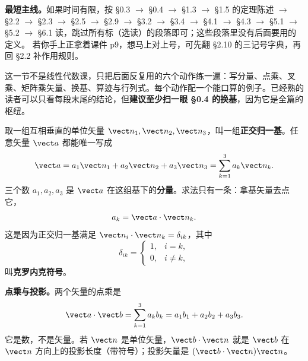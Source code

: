 \documentclass[11pt]{ctexart}
\let\orighdr\hdr
\renewcommand{\hdr}[2]{\par\needspace{10\baselineskip}\orighdr{#1}{#2}}
\let\origsubhdr\subhdr
\renewcommand{\subhdr}[1]{\par\needspace{3\baselineskip}\origsubhdr{#1}}
\begin{document}

\textbf{最短主线。}如果时间有限，按 §0.3 $\to$ §0.4 $\to$ §1.3 $\to$ §1.5 的定理陈述 $\to$ §2.2 $\to$ §2.3 $\to$ §2.5 $\to$ §2.9 $\to$ §3.2 $\to$ §3.4 $\to$ §4.1 $\to$ §4.3 $\to$ §5.1 $\to$ §5.2 $\to$ §6.1 读，跳过所有标（选读）的段落即可；这些段落里没有后面要用的定义。
若你手上正拿着课件 p9，想马上对上号，可先翻 §2.10 的三记号字典，再回 §2.2 补作用规则。


这一节不是线性代数课，只把后面反复用的六个动作练一遍：写分量、点乘、叉乘、矩阵乘矢量、换基、算迹与行列式。每个动作配一个能口算的例子。已经熟的读者可以只看每段末尾的结论，但\textbf{建议至少扫一眼 §0.4 的换基}，因为它是全篇的枢纽。



取一组互相垂直的单位矢量 $\vect n_1,\vect n_2,\vect n_3$，叫一组\textbf{正交归一基}。任意矢量 $\vect a$ 都能唯一写成
\[
\vect a=a_1\vect n_1+a_2\vect n_2+a_3\vect n_3=\sum_{k=1}^{3}a_k\vect n_k .
\]
三个数 $a_1,a_2,a_3$ 是 $\vect a$ 在这组基下的\textbf{分量}。求法只有一条：拿基矢量去点它，
\[
a_k=\vect a\cdot\vect n_k .
\]
这是因为正交归一基满足 $\vect n_i\cdot\vect n_k=\delta_{ik}$，其中
\[
\delta_{ik}=\begin{cases}1,&i=k,\\0,&i\ne k,\end{cases}
\]
叫\textbf{克罗内克符号}。

\textbf{点乘与投影。}两个矢量的点乘是
\[
\vect a\cdot\vect b=\sum_{k=1}^{3}a_kb_k=a_1b_1+a_2b_2+a_3b_3 .
\]
它是数，不是矢量。若 $\vect n$ 是单位矢量，$\vect b\cdot\vect n$ 就是 $\vect b$ 在 $\vect n$ 方向上的投影长度（带符号）；投影矢量是 $(\vect b\cdot\vect n)\vect n$。
\end{document}
